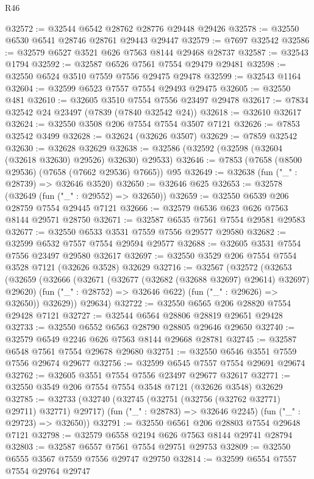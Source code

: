 \begin{lexlean}{R46}
\begin{coremodule}
@32572 := @32544 @6542 @28762 @28776 @29448 @29426
@32578 := @32550 @6530 @6541 @28746 @28761 @29443 @29447
@32579 := @7697 @32542
@32586 := @32579 @6527 @3521 @626 @7563 @8144 @29468 @28737
@32587 := @32543 @1794
@32592 := @32587 @6526 @7561 @7554 @29479 @29481
@32598 := @32550 @6524 @3510 @7559 @7556 @29475 @29478
@32599 := @32543 @1164
@32604 := @32599 @6523 @7557 @7554 @29493 @29475
@32605 := @32550 @481
@32610 := @32605 @3510 @7554 @7556 @23497 @29478
@32617 := @7834 @32542 @24 @23497 (@7839 (@7840 @32542 @24))
@32618 := @32610 @32617
@32624 := @32550 @3508 @206 @7554 @7554 @3507 @7121
@32626 := @7853 @32542 @3499
@32628 := @32624 (@32626 @3507)
@32629 := @7859 @32542
@32630 := @32628 @32629
@32638 := @32586 (@32592 (@32598 (@32604 (@32618 @32630) @29526) @32630) @29533)
@32646 := @7853 (@7658 (@8500 @29536) (@7658 (@7662 @29536) @7665)) @95
@32649 := @32638 (fun ("_" : @28739) => @32646 @3520)
@32650 := @32646 @625
@32653 := @32578 (@32649 (fun ("_" : @29552) => @32650))
@32659 := @32550 @6539 @206 @28759 @7554 @29445 @7121
@32666 := @32579 @6536 @623 @626 @7563 @8144 @29571 @28750
@32671 := @32587 @6535 @7561 @7554 @29581 @29583
@32677 := @32550 @6533 @3531 @7559 @7556 @29577 @29580
@32682 := @32599 @6532 @7557 @7554 @29594 @29577
@32688 := @32605 @3531 @7554 @7556 @23497 @29580 @32617
@32697 := @32550 @3529 @206 @7554 @7554 @3528 @7121 (@32626 @3528) @32629
@32716 := @32567
    (@32572
      (@32653
        (@32659
          (@32666
            (@32671 (@32677 (@32682 (@32688 @32697) @29614) @32697) @29620)
            (fun ("_" : @28752) => @32646 @622)
            (fun ("_" : @29626) => @32650))
          @32629))
      @29634)
@32722 := @32550 @6565 @206 @28820 @7554 @29428 @7121
@32727 := @32544 @6564 @28806 @28819 @29651 @29428
@32733 := @32550 @6552 @6563 @28790 @28805 @29646 @29650
@32740 := @32579 @6549 @2246 @626 @7563 @8144 @29668 @28781
@32745 := @32587 @6548 @7561 @7554 @29678 @29680
@32751 := @32550 @6546 @3551 @7559 @7556 @29674 @29677
@32756 := @32599 @6545 @7557 @7554 @29691 @29674
@32762 := @32605 @3551 @7554 @7556 @23497 @29677 @32617
@32771 := @32550 @3549 @206 @7554 @7554 @3548 @7121 (@32626 @3548) @32629
@32785 := @32733
    (@32740
      (@32745 (@32751 (@32756 (@32762 @32771) @29711) @32771) @29717)
      (fun ("_" : @28783) => @32646 @2245)
      (fun ("_" : @29723) => @32650))
@32791 := @32550 @6561 @206 @28803 @7554 @29648 @7121
@32798 := @32579 @6558 @2194 @626 @7563 @8144 @29741 @28794
@32803 := @32587 @6557 @7561 @7554 @29751 @29753
@32809 := @32550 @6555 @3567 @7559 @7556 @29747 @29750
@32814 := @32599 @6554 @7557 @7554 @29764 @29747

\end{coremodule}
\end{lexlean}
